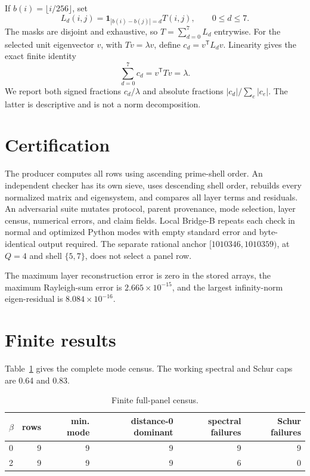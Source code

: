 \documentclass[10pt]{article}
\begin{document}
If \(b(i)=\lfloor i/256\rfloor\), set
\[
 L_d(i,j)=\mathbf 1_{|b(i)-b(j)|=d}T(i,j),\qquad 0\leq d\leq7.
\]
The masks are disjoint and exhaustive, so \(T=\sum_{d=0}^7L_d\) entrywise.
For the selected unit eigenvector \(v\), with \(Tv=\lambda v\), define
\(c_d=v^{\mathsf T}L_dv\).  Linearity gives the exact finite identity
\[
 \sum_{d=0}^7c_d=v^{\mathsf T}Tv=\lambda.
\]
We report both signed fractions \(c_d/\lambda\) and absolute fractions
\(|c_d|/\sum_e|c_e|\).  The latter is descriptive and is not a norm
decomposition.

\section{Certification}

The producer computes all rows using ascending prime-shell order.  An
independent checker has its own sieve, uses descending shell order, rebuilds
every normalized matrix and eigensystem, and compares all layer terms and
residuals.  An adversarial suite mutates protocol, parent provenance, mode
selection, layer census, numerical errors, and claim fields.  Local Bridge-B
repeats each check in normal and optimized Python modes with empty standard
error and byte-identical output required.  The separate rational anchor
\([1010346,1010359)\), at \(Q=4\) and shell \(\{5,7\}\), does not select a
panel row.

The maximum layer reconstruction error is zero in the stored arrays, the
maximum Rayleigh-sum error is \(2.665\times10^{-15}\), and the largest
infinity-norm eigen-residual is \(8.084\times10^{-16}\).

\section{Finite results}

Table~\ref{tab:census} gives the complete mode census.  The working spectral
and Schur caps are 0.64 and 0.83.

\begin{table}[h]
\centering
\caption{Finite full-panel census.}
\label{tab:census}
\begin{tabular}{@{}lrrrrr@{}}
\toprule
\(\beta\) & rows & min. mode & distance-0 dominant & spectral failures & Schur failures\\
\midrule
0 & 9 & 9 & 9 & 9 & 9\\
2 & 9 & 9 & 9 & 6 & 0\\
\bottomrule
\end{tabular}
\end{table}
\end{document}
